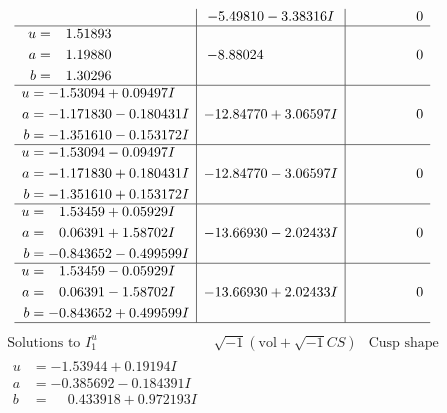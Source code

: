\documentclass[1p]{elsarticle_modified}
\theoremstyle{definition}
\newcommand{\I}{\sqrt{-1}}
\begin{document}
$$\begin{array}{c|c|c}
 & -5.49810 - 3.38316 I & \phantom{-0.000000 } 0 \\ \hline\begin{aligned}
u &= \phantom{-}1.51893\phantom{ +0.000000I} \\
a &= \phantom{-}1.19880\phantom{ +0.000000I} \\
b &= \phantom{-}1.30296\phantom{ +0.000000I}\end{aligned}
 & -8.88024\phantom{ +0.000000I} & \phantom{-0.000000 } 0 \\ \hline\begin{aligned}
u &= -1.53094 + 0.09497 I \\
a &= -1.171830 - 0.180431 I \\
b &= -1.351610 - 0.153172 I\end{aligned}
 & -12.84770 + 3.06597 I & \phantom{-0.000000 } 0 \\ \hline\begin{aligned}
u &= -1.53094 - 0.09497 I \\
a &= -1.171830 + 0.180431 I \\
b &= -1.351610 + 0.153172 I\end{aligned}
 & -12.84770 - 3.06597 I & \phantom{-0.000000 } 0 \\ \hline\begin{aligned}
u &= \phantom{-}1.53459 + 0.05929 I \\
a &= \phantom{-}0.06391 + 1.58702 I \\
b &= -0.843652 - 0.499599 I\end{aligned}
 & -13.66930 - 2.02433 I & \phantom{-0.000000 } 0 \\ \hline\begin{aligned}
u &= \phantom{-}1.53459 - 0.05929 I \\
a &= \phantom{-}0.06391 - 1.58702 I \\
b &= -0.843652 + 0.499599 I\end{aligned}
 & -13.66930 + 2.02433 I & \phantom{-0.000000 } 0\\
 \hline 
 \end{array}$$\newpage$$\begin{array}{c|c|c}  
\text{Solutions to }I^u_{1}& \I (\text{vol} + \sqrt{-1}CS) & \text{Cusp shape}\\
 \hline 
\begin{aligned}
u &= -1.53944 + 0.19194 I \\
a &= -0.385692 - 0.184391 I \\
b &= \phantom{-}0.433918 + 0.972193 I\end{aligned}

\end{array}$$
\end{document}
